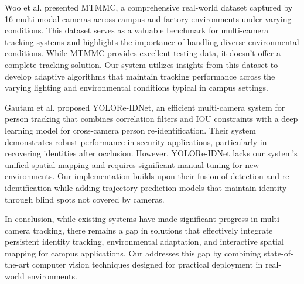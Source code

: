 Woo et al. \cite{mtmmc} presented MTMMC, a comprehensive real-world dataset captured by 16 multi-modal cameras across campus and factory environments under varying conditions. This dataset serves as a valuable benchmark for multi-camera tracking systems and highlights the importance of handling diverse environmental conditions. While MTMMC provides excellent testing data, it doesn't offer a complete tracking solution. Our system utilizes insights from this dataset to develop adaptive algorithms that maintain tracking performance across the varying lighting and environmental conditions typical in campus settings.


Gautam et al. \cite{yoloreidnet} proposed YOLORe-IDNet, an efficient multi-camera system for person tracking that combines correlation filters and IOU constraints with a deep learning model for cross-camera person re-identification. Their system demonstrates robust performance in security applications, particularly in recovering identities after occlusion. However, YOLORe-IDNet lacks our system's unified spatial mapping and requires significant manual tuning for new environments. Our implementation builds upon their fusion of detection and re-identification while adding trajectory prediction models that maintain identity through blind spots not covered by cameras.

In conclusion, while existing systems have made significant progress in multi-camera tracking, there remains a gap in solutions that effectively integrate persistent identity tracking, environmental adaptation, and interactive spatial mapping for campus applications. Our \usevar{\srsTitle} addresses this gap by combining state-of-the-art computer vision techniques designed for practical deployment in real-world environments.